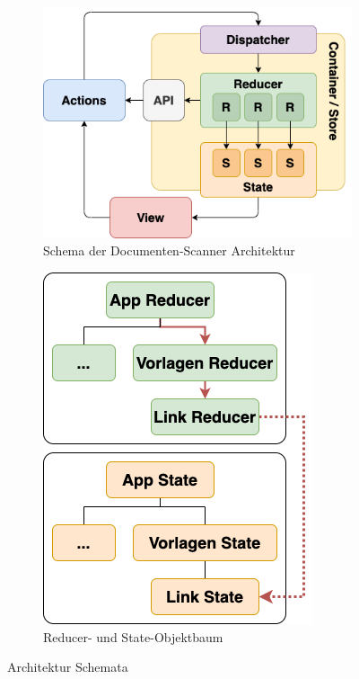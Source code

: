 \documentclass[nomenclature, oneside, 150]{HSMW-Thesis}
\begin{document}
		\begin{figure}[th]
			\centering
			\begin{subfigure}[t]{0.48\textwidth}
				\centering
				\includegraphics[width=\textwidth]{img/redux.png}
				\caption{Schema der Documenten-Scanner Architektur}
				\label{fig:redux}
			\end{subfigure}
			\begin{subfigure}[t]{0.48\textwidth}
				\centering
				\includegraphics[height=0.9\textwidth]{img/tree_example.png}
				\caption{Reducer- und State-Objektbaum}
				\label{fig:tree}
			\end{subfigure}
			\caption{Architektur Schemata}
		\end{figure}
		
\end{document}
